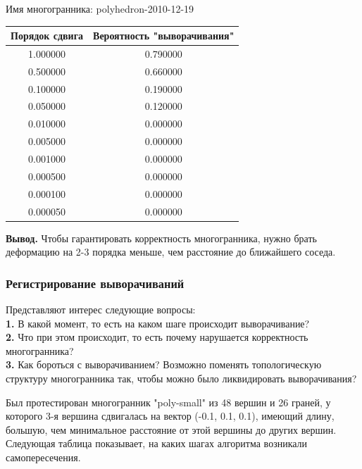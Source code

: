 \documentclass[a4paper,12pt, titlepage]{article}
\begin{document}
\begin{flushleft}
Имя многогранника: polyhedron-2010-12-19\\
\begin{tabular}{|c|c|}
\hline
	Порядок сдвига & Вероятность "выворачивания"\\
\hline
	1.000000 &	0.790000\\
\hline
	0.500000 &	0.660000\\
\hline
	0.100000 &	0.190000\\
\hline
	0.050000 &	0.120000\\
\hline
	0.010000 &	0.000000\\
\hline
	0.005000 &	0.000000\\
\hline
	0.001000 &	0.000000\\
\hline
	0.000500 &	0.000000\\
\hline
	0.000100 &	0.000000\\
\hline
	0.000050 &	0.000000\\
\hline
\end{tabular}
\end{flushleft}

\begin{flushleft}
 \textbf{Вывод. }Чтобы гарантировать корректность многогранника, нужно брать деформацию на 2-3 порядка меньше, чем 
расстояние до ближайшего соседа.
\end{flushleft}

\subsubsection{Регистрирование выворачиваний}
\begin{flushleft}
 Представляют интерес следующие вопросы:\\
\textbf{1.} В какой момент, то есть на каком шаге происходит выворачивание?\\
\textbf{2.} Что при этом происходит, то есть почему нарушается корректность многогранника?\\
\textbf{3.} Как бороться с выворачиванием? Возможно поменять топологическую структуру многогранника так,
чтобы можно было ликвидировать выворачивания?
\end{flushleft}

\begin{flushleft}
 Был протестирован многогранник "poly-small"  из 48 вершин и 26 граней, у которого 3-я вершина сдвигалась 
на вектор (-0.1, 0.1, 0.1), имеющий длину, большую, чем минимальное расстояние от этой вершины до 
других вершин. Следующая таблица показывает, на каких шагах алгоритма возникали самопересечения.
\end{flushleft}
\end{document}
